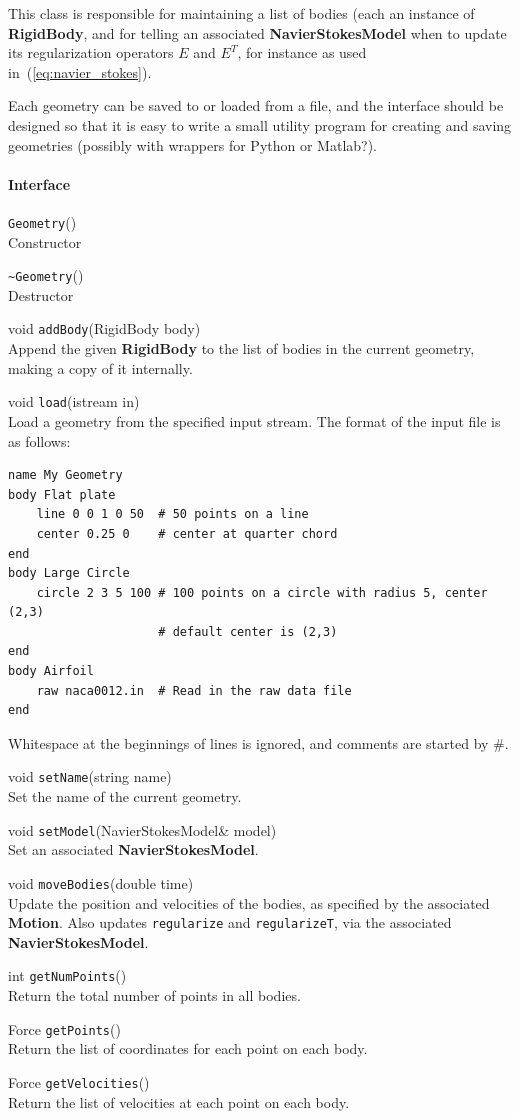 \documentclass[11pt]{article}
\def\class#1{{\bf #1}} %
\def\fn#1{{\tt #1}} %
\begin{document}
This class is responsible for maintaining a list of bodies (each an instance of \class{RigidBody}, and for telling an associated \class{NavierStokesModel} when to update its regularization operators $E$ and $E^T$, for instance as used in~(\ref{eq:navier_stokes}).

Each geometry can be saved to or loaded from a file, and the interface should be designed so that it is easy to write a small utility program for creating and saving geometries (possibly with wrappers for Python or Matlab?).  

\paragraph{Interface}
\begin{description}
	\item \fn{Geometry}() \\
		Constructor
	\item \fn{\~\null Geometry}() \\
		Destructor
	\item void \fn{addBody}(RigidBody body) \\
		Append the given \class{RigidBody} to the list of bodies in the current geometry, making a copy of it internally.
	\item void \fn{load}(istream in) \\
		Load a geometry from the specified input stream.  The format of the input file is as follows:
\begin{verbatim}
name My Geometry
body Flat plate
	line 0 0 1 0 50  # 50 points on a line
	center 0.25 0    # center at quarter chord
end
body Large Circle
	circle 2 3 5 100 # 100 points on a circle with radius 5, center (2,3)
					 # default center is (2,3)
end
body Airfoil
	raw naca0012.in  # Read in the raw data file
end
		\end{verbatim}
	 Whitespace at the beginnings of lines is ignored, and comments are started by \#.
	\item void \fn{setName}(string name) \\
		Set the name of the current geometry.
	\item void \fn{setModel}(NavierStokesModel\& model) \\
		Set an associated \class{NavierStokesModel}.
	\item void \fn{moveBodies}(double time) \\
		Update the position and velocities of the bodies, as specified by the associated \class{Motion}.  Also updates \fn{regularize} and \fn{regularizeT}, via the associated \class{NavierStokesModel}.
	\item int \fn{getNumPoints}() \\
		Return the total number of points in all bodies.
	\item Force \fn{getPoints}() \\
		Return the list of coordinates for each point on each body.
	\item Force \fn{getVelocities}() \\
		Return the list of velocities at each point on each body.		
\end{description}
\end{document}
